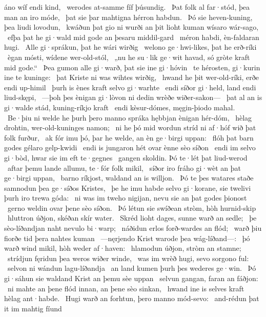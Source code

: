 áno wíf endi kind, \hld\ werodes at-samme
fíf þúsundig. \hld\ Þat folk al far·stód,
þea man an iro móde, \hld\ þat sie þar mahtigna
hérron habdun. \hld\ Þó sie heven-kuning,
þea liudi lovodun, \hld\ kwáðun þat gio ni wurði an þit lioht kuman
wísaro wár-sago, \hld\ efþa þat he gi·wald mid gode
an þesaru middil-gard \hld\ méron habdi,
èn-faldaran hugi. \hld\ Alle gi·sprákun,
þat he wári wirðig \hld\ welono ge·hwi-likes,
þat he erð-ríki \hld\ ègan mósti,
wídene wer-old-stól, \hld\ „nu he su·lik ge·wit havad,
só gròte kraft mid gode.“ \hld\ Þea gumon alle gi·warð,
þat sie ine gi·hóvin \hld\ te hérosten,
gi·kurin ine te kuninge: \hld\ þat Kriste ni was
wihtes wirðig, \hld\ hwand he þit wer-old-ríki,
erðe endi up-himil \hld\ þurh is ènes kraft
selvo gi·warhte \hld\ endi síðor gi·held,
land endi liud-skępi, \hld\ —þoh þes ènigan gi·lòvon ni dedin
wrèðe wiðer-sakon— \hld\ þat al an is gi·walde stád,
kuning-ríkjo kraft \hld\ endi kèsur-dómes,
męgin-þiodo mahal. \hld\ Be·þiu ni welde he þurh þero manno spráka
hębbjan ènigan hér-dóm, \hld\ hèlag drohtin,
wer-old-kuninges namon; \hld\ ni he þó mid wordun stríd
ni af·hóf wið þat folk furður, \hld\ ak fór imu þó, þar he welde,
an èn ge·birgi uppan: \hld\ flóh þat barn godes
gélaro gelp-kwidi \hld\ endi is jungaron hét
ovar ènne sèo síðon \hld\ endi im selvo gi·bòd,
hwar sie im eft te·gegnes \hld\ gangen skoldin.
Þó te·lét þat liud-werod \hld\ aftar þemu lande allumu,
te·fór folk mikil, \hld\ síðor iro fráho gi·wèt
an þat ge·birgi uppan, \hld\ barno ríkjost,
waldand an is willjon. \hld\ Þó te þes watares staðe
samnodun þea ge·síðos Kristes, \hld\ þe he imu habde selvo gi·korane,
sie twelivi þurh iro trewa góda: \hld\ ni was im tweho nigijan,
nevu sie an þat godes þionost \hld\ gerno weldin
ovar þene sèo síðon. \hld\ Þó létun sie swíðean stròm,
hòh hurnid-skip \hld\ hluttron úðjon,
skéðan skír water. \hld\ Skréd lioht dages,
sunne warð an sedle; \hld\ þe sèo-líðandjan
naht nevulo bi·warp; \hld\ náðidun erlos
forð-wardes an flód; \hld\ warð þiu fiorðe tid
þera nahtes kuman \hld\ —nęrjendo Krist
warode þea wág-líðand—: \hld\ þó warð wind mikil,
hòh weder af·haven: \hld\ hlamodun úðjon,
stròm an stamne; \hld\ strídjun fęridun
þea weros wiðer winde, \hld\ was im wrèð hugi,
sevo sorgono ful: \hld\ selvon ni wándun
lagu-líðandja \hld\ an land kumen
þurh þes wederes ge·win. \hld\ Þó gi·sáhun sie waldand Krist
an þemu sèe uppan \hld\ selvun gangan,
faran an fáðjon: \hld\ ni mahte an þene flód innan,
an þene sèo sinkan, \hld\ hwand ine is selves kraft
hèlag ant·habde. \hld\ Hugi warð an forhtun,
þero manno mód-sevo: \hld\ and-rédun þat it im mahtig fíund
